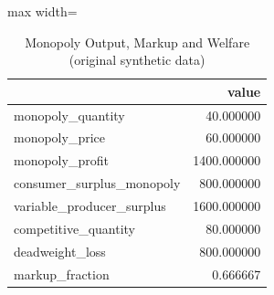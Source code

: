 \begin{table}[htbp]
\centering
\caption{Monopoly Output, Markup and Welfare (original synthetic data)}
\begingroup
\small
\setlength{\tabcolsep}{6pt}
\renewcommand{\arraystretch}{1.12}
\begin{adjustbox}{max width=\linewidth}
\begin{tabular}{@{}lr@{}}
\toprule
 & value \\
\midrule
monopoly\_quantity & 40.000000 \\
monopoly\_price & 60.000000 \\
monopoly\_profit & 1400.000000 \\
consumer\_surplus\_monopoly & 800.000000 \\
variable\_producer\_surplus & 1600.000000 \\
competitive\_quantity & 80.000000 \\
deadweight\_loss & 800.000000 \\
markup\_fraction & 0.666667 \\
\bottomrule
\end{tabular}
\end{adjustbox}
\endgroup
\end{table}
